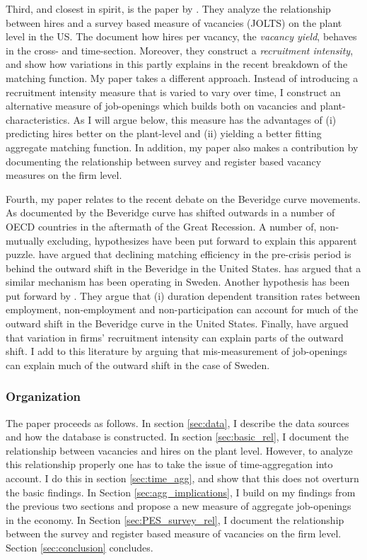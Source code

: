 Third, and closest in spirit, is the paper by \cite{Davis2013}. They analyze the relationship between hires and a survey based measure of vacancies (JOLTS) on the plant level in the US. The document how hires per vacancy, the \emph{vacancy yield}, behaves in the cross- and time-section. Moreover, they construct a \emph{recruitment intensity}, and show how variations in this partly explains in the recent breakdown of the matching function. My paper takes a different approach. Instead of introducing a recruitment intensity measure that is varied to vary over time, I construct an alternative measure of job-openings which builds both on vacancies and plant-characteristics. As I will argue below, this measure has the advantages of (i) predicting hires better on the plant-level and (ii) yielding a better fitting aggregate matching function. In addition, my paper also makes a contribution by documenting the relationship between survey and register based vacancy measures on the firm level. 

Fourth, my paper relates to the recent debate on the Beveridge curve movements. As documented by \cite{Hobijn2012} the Beveridge curve has shifted outwards in a number of OECD countries in the aftermath of the Great Recession. A number of, non-mutually excluding, hypothesizes have been put forward to explain this apparent puzzle. \cite{Hall2015} have argued that declining matching efficiency in the pre-crisis period is behind the outward shift in the Beveridge in the United States. \cite{Riksbank2012} has argued that a similar mechanism has been operating in Sweden. Another hypothesis has been put forward by \cite{Kroft2016}. They argue that (i) duration dependent transition rates between employment, non-employment and non-participation can account for much of the outward shift in the Beveridge curve in the United States. Finally, \cite{Davis2013} have argued that variation in firms’ recruitment intensity can explain parts of the outward shift. I add to this literature by arguing that mis-measurement of job-openings can explain much of the outward shift in the case of Sweden. 

\subsubsection{Organization}

The paper proceeds as follows. In section \ref{sec:data}, I describe the data sources and how the database is constructed. In section \ref{sec:basic_rel}, I document the relationship between vacancies and hires on the plant level. However, to analyze this relationship properly one has to take the issue of time-aggregation into account. I do this in section \ref{sec:time_agg}, and show that this does not overturn the basic findings. In Section \ref{sec:agg_implications}, I build on my findings from the previous two sections and propose a new measure of aggregate job-openings in the economy. In Section \ref{sec:PES_survey_rel}, I document the relationship between the survey and register based measure of vacancies on the firm level. Section \ref{sec:conclusion} concludes.